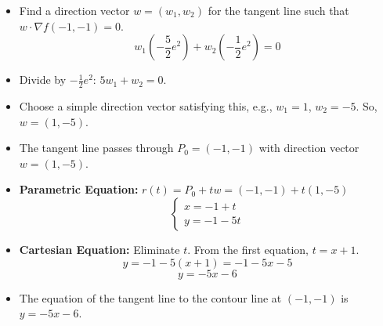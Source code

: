 \begin{cascade}
\begin{itemize}
\begin{itemize}
			      \item Find a direction vector $w = (w_1, w_2)$ for the tangent line such that $w \cdot \nabla f(-1,-1) = 0$.
			            $$ w_1 \left(-\frac{5}{2}e^2\right) + w_2 \left(-\frac{1}{2}e^2\right) = 0 $$
			      \item Divide by $-\frac{1}{2}e^2$: $5w_1 + w_2 = 0$.
			      \item Choose a simple direction vector satisfying this, e.g., $w_1 = 1$, $w_2 = -5$. So, $w = (1, -5)$.
			      \item The tangent line passes through $P_0 = (-1, -1)$ with direction vector $w = (1, -5)$.
			      \item \textbf{Parametric Equation:} $r(t) = P_0 + tw = (-1, -1) + t(1, -5)$
			            $$ \begin{cases} x = -1 + t \\ y = -1 - 5t \end{cases} $$
			      \item \textbf{Cartesian Equation:} Eliminate $t$. From the first equation, $t = x + 1$.
			            $$ y = -1 - 5(x+1) = -1 - 5x - 5 $$
			            $$ y = -5x - 6 $$
			      \item The equation of the tangent line to the contour line at $(-1,-1)$ is $y = -5x - 6$.
		      \end{itemize}
	\end{itemize}
\end{cascade}

\clearpage
